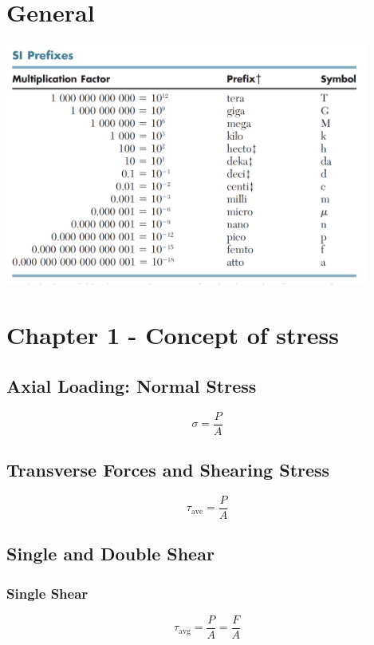 \documentclass[10pt,landscape]{article}
\newenvironment{Figure}
     {\par\medskip\noindent\minipage{\linewidth}}
     {\endminipage\par\medskip}
\begin{document}
\begin{multicols}{3}
\section{General}
\begin{Figure}
    \centering
    \includegraphics[width=\linewidth, height=8cm]{SI_Prefix.png}
\end{Figure}
\section{Chapter 1 - Concept of stress}
\subsection{Axial Loading: Normal Stress}
\begin{equation}
    \sigma=\frac{P}{A}
\end{equation}
\subsection{Transverse Forces and Shearing Stress}
\begin{equation}
    \tau_{\text{ave}}=\frac{P}{A}
\end{equation}
\subsection{Single and Double Shear}
\subsubsection{Single Shear}
\begin{equation}
    \tau_{\text{avg}}=\frac{P}{A}=\frac{F}{A}
\end{equation}

\end{multicols}
\end{document}
